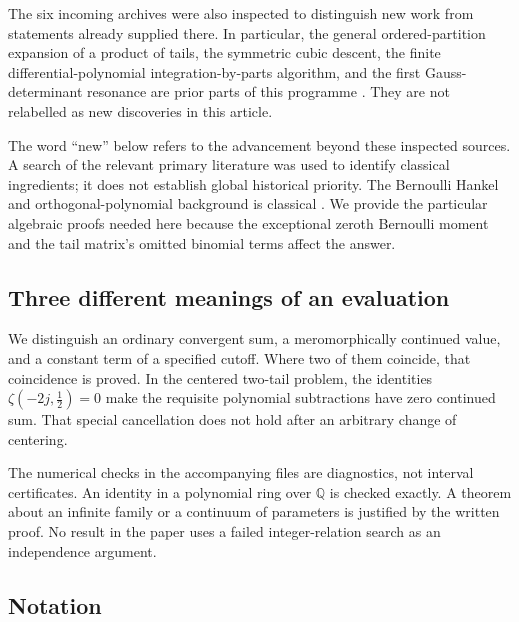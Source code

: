 \documentclass[11pt,letterpaper]{article}
\theoremstyle{definition}
\theoremstyle{remark}
\newcommand{\Q}{\mathbb Q}
\numberwithin{equation}{section}
\begin{document}
The six incoming archives were also inspected to distinguish new work
from statements already supplied there. In particular, the general
ordered-partition expansion of a product of tails, the symmetric cubic
descent, the finite differential-polynomial integration-by-parts
algorithm, and the first Gauss-determinant resonance are prior parts of
this programme \cite{incoming-cubic,incoming-differential,
incoming-determinantal,incoming-tail,incoming-multishift}.
They are not relabelled as new discoveries in this article.

The word ``new'' below refers to the advancement beyond these inspected
sources. A search of the relevant primary literature was used to identify
classical ingredients; it does not establish global historical priority.
The Bernoulli Hankel and orthogonal-polynomial background is classical
\cite{dilcher-jiu,dlmf-op}. We provide the particular algebraic proofs
needed here because the exceptional zeroth Bernoulli moment and the
tail matrix's omitted binomial terms affect the answer.

\subsection{Three different meanings of an evaluation}

We distinguish an ordinary convergent sum, a meromorphically continued
value, and a constant term of a specified cutoff. Where two of them
coincide, that coincidence is proved. In the centered two-tail problem,
the identities $\zeta(-2j,\tfrac12)=0$ make the requisite polynomial
subtractions have zero continued sum. That special cancellation does
not hold after an arbitrary change of centering.

The numerical checks in the accompanying files are diagnostics, not
interval certificates. An identity in a polynomial ring over $\Q$ is
checked exactly. A theorem about an infinite family or a continuum of
parameters is justified by the written proof. No result in the paper
uses a failed integer-relation search as an independence argument.

\subsection{Notation}
\end{document}
